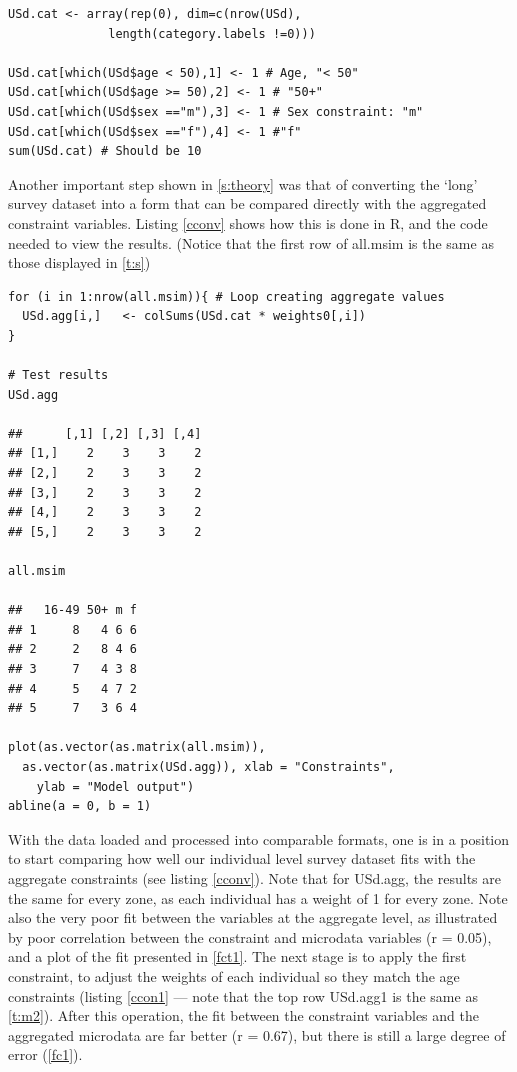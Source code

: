 \documentclass[a4paper, 11pt, twoside]{Thesis}
\begin{document}
\begin{lstlisting}[float = h, caption={R code to convert the survey
dataset into binary form}, label=ccat]
USd.cat <- array(rep(0), dim=c(nrow(USd),
			  length(category.labels !=0)))

USd.cat[which(USd$age < 50),1] <- 1 # Age, "< 50"
USd.cat[which(USd$age >= 50),2] <- 1 # "50+"
USd.cat[which(USd$sex =="m"),3] <- 1 # Sex constraint: "m"
USd.cat[which(USd$sex =="f"),4] <- 1 #"f"
sum(USd.cat) # Should be 10
\end{lstlisting}

Another important step shown in \cref{s:theory} was that of converting the
`long' survey dataset into a form that can be compared directly with the
aggregated constraint variables. Listing \ref{cconv} shows how this is done
in R, and the code needed to view the results. (Notice that the first row
of all.msim is the same as those displayed in \cref{t:s})

\begin{lstlisting}[float=h, caption={R code to aggregate the survey dataset},
label=cconv]
 for (i in 1:nrow(all.msim)){ # Loop creating aggregate values 
  USd.agg[i,]   <- colSums(USd.cat * weights0[,i])
}

# Test results
USd.agg

##      [,1] [,2] [,3] [,4]
## [1,]    2    3    3    2
## [2,]    2    3    3    2
## [3,]    2    3    3    2
## [4,]    2    3    3    2
## [5,]    2    3    3    2

all.msim

##   16-49 50+ m f
## 1     8   4 6 6
## 2     2   8 4 6
## 3     7   4 3 8
## 4     5   4 7 2
## 5     7   3 6 4

plot(as.vector(as.matrix(all.msim)),
  as.vector(as.matrix(USd.agg)), xlab = "Constraints",
    ylab = "Model output")
abline(a = 0, b = 1)
\end{lstlisting}

With the data loaded and processed into comparable formats, one is in a
position to start comparing how well our individual level survey dataset
fits with the aggregate constraints (see listing \ref{cconv}). Note that for USd.agg,
the results are the same for every zone, as each individual has a weight of 1
for every zone. Note also the very poor fit between the variables at the
aggregate level, as illustrated by poor correlation between the constraint and
microdata variables (r = 0.05), and a plot of the fit presented in \cref{fct1}.
The next stage is to apply the first constraint,
to adjust the weights of each individual so they match the age constraints
(listing \ref{ccon1} --- note that the top row USd.agg1 is the same as
\cref{t:m2}). After this operation, the fit between the constraint
variables and the aggregated microdata are far better (r = 0.67), but there
is still a large degree of error (\cref{fc1}).
\end{document}
